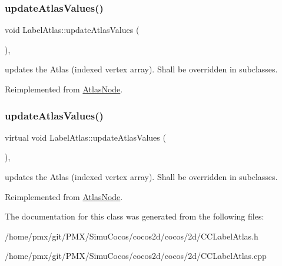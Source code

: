 \subsubsection{\texorpdfstring{update\+Atlas\+Values()}{updateAtlasValues()}\hspace{0.1cm}{\footnotesize\ttfamily [1/2]}}
{\footnotesize\ttfamily void Label\+Atlas\+::update\+Atlas\+Values (\begin{DoxyParamCaption}{ }\end{DoxyParamCaption})\hspace{0.3cm}{\ttfamily [override]}, {\ttfamily [virtual]}}

updates the Atlas (indexed vertex array). Shall be overridden in subclasses. 

Reimplemented from \hyperlink{classAtlasNode_ace1c88a0277a601bc02180da9641ebcd}{Atlas\+Node}.

\mbox{\label{classLabelAtlas_a0075a4071c6da704b665bca30393ac5b}} 
\subsubsection{\texorpdfstring{update\+Atlas\+Values()}{updateAtlasValues()}\hspace{0.1cm}{\footnotesize\ttfamily [2/2]}}
{\footnotesize\ttfamily virtual void Label\+Atlas\+::update\+Atlas\+Values (\begin{DoxyParamCaption}{ }\end{DoxyParamCaption})\hspace{0.3cm}{\ttfamily [override]}, {\ttfamily [virtual]}}

updates the Atlas (indexed vertex array). Shall be overridden in subclasses. 

Reimplemented from \hyperlink{classAtlasNode_ace1c88a0277a601bc02180da9641ebcd}{Atlas\+Node}.



The documentation for this class was generated from the following files\+:\begin{DoxyCompactItemize}
\item 
/home/pmx/git/\+P\+M\+X/\+Simu\+Cocos/cocos2d/cocos/2d/C\+C\+Label\+Atlas.\+h\item 
/home/pmx/git/\+P\+M\+X/\+Simu\+Cocos/cocos2d/cocos/2d/C\+C\+Label\+Atlas.\+cpp\end{DoxyCompactItemize}
